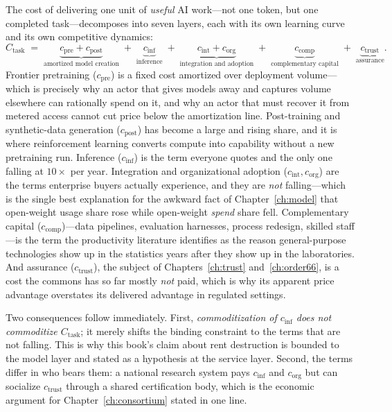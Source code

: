 The cost of delivering one unit of \emph{useful} AI work---not one token, but one completed task---decomposes into seven layers, each with its own learning curve and its own competitive dynamics:
\[
C_{\text{task}} \;=\; \underbrace{c_{\text{pre}} + c_{\text{post}}}_{\text{amortized model creation}} \;+\; \underbrace{c_{\text{inf}}}_{\text{inference}} \;+\; \underbrace{c_{\text{int}} + c_{\text{org}}}_{\text{integration and adoption}} \;+\; \underbrace{c_{\text{comp}}}_{\text{complementary capital}} \;+\; \underbrace{c_{\text{trust}}}_{\text{assurance}} .
\]
Frontier pretraining ($c_{\text{pre}}$) is a fixed cost amortized over deployment volume---which is precisely why an actor that gives models away and captures volume elsewhere can rationally spend on it, and why an actor that must recover it from metered access cannot cut price below the amortization line. Post-training and synthetic-data generation ($c_{\text{post}}$) has become a large and rising share, and it is where reinforcement learning converts compute into capability without a new pretraining run. Inference ($c_{\text{inf}}$) is the term everyone quotes and the only one falling at $10\times$ per year. Integration and organizational adoption ($c_{\text{int}}, c_{\text{org}}$) are the terms enterprise buyers actually experience, and they are \emph{not} falling---which is the single best explanation for the awkward fact of Chapter~\ref{ch:model} that open-weight usage share rose while open-weight \emph{spend} share fell. Complementary capital ($c_{\text{comp}}$)---data pipelines, evaluation harnesses, process redesign, skilled staff---is the term the productivity literature identifies as the reason general-purpose technologies show up in the statistics years after they show up in the laboratories. And assurance ($c_{\text{trust}}$), the subject of Chapters~\ref{ch:trust} and~\ref{ch:order66}, is a cost the commons has so far mostly \emph{not} paid, which is why its apparent price advantage overstates its delivered advantage in regulated settings.

Two consequences follow immediately. First, \emph{commoditization of $c_{\text{inf}}$ does not commoditize $C_{\text{task}}$}; it merely shifts the binding constraint to the terms that are not falling. This is why this book's claim about rent destruction is bounded to the model layer and stated as a hypothesis at the service layer. Second, the terms differ in who bears them: a national research system pays $c_{\text{inf}}$ and $c_{\text{org}}$ but can socialize $c_{\text{trust}}$ through a shared certification body, which is the economic argument for Chapter~\ref{ch:consortium} stated in one line.

